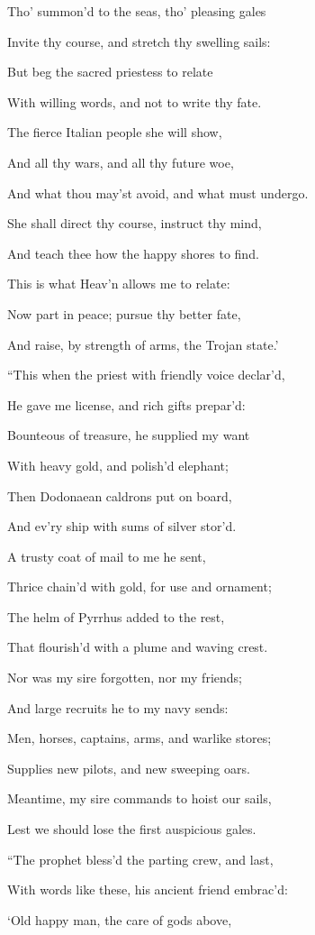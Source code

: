 Tho’ summon’d to the seas, tho’ pleasing gales

Invite thy course, and stretch thy swelling sails:

But beg the sacred priestess to relate

With willing words, and not to write thy fate.

The fierce Italian people she will show,

And all thy wars, and all thy future woe,

And what thou may’st avoid, and what must undergo.

She shall direct thy course, instruct thy mind,

And teach thee how the happy shores to find.

This is what Heav’n allows me to relate:

Now part in peace; pursue thy better fate,

And raise, by strength of arms, the Trojan state.’

“This when the priest with friendly voice declar’d,

He gave me license, and rich gifts prepar’d:

Bounteous of treasure, he supplied my want

With heavy gold, and polish’d elephant;

Then Dodonaean caldrons put on board,

And ev’ry ship with sums of silver stor’d.

A trusty coat of mail to me he sent,

Thrice chain’d with gold, for use and ornament;

The helm of Pyrrhus added to the rest,

That flourish’d with a plume and waving crest.

Nor was my sire forgotten, nor my friends;

And large recruits he to my navy sends:

Men, horses, captains, arms, and warlike stores;

Supplies new pilots, and new sweeping oars.

Meantime, my sire commands to hoist our sails,

Lest we should lose the first auspicious gales.

“The prophet bless’d the parting crew, and last,

With words like these, his ancient friend embrac’d:

‘Old happy man, the care of gods above,

